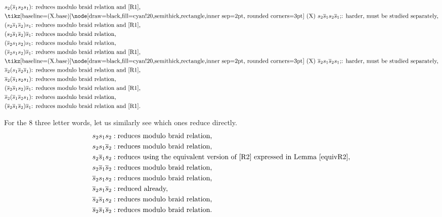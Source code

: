 \documentclass[12pt,reqno]{amsart}
\theoremstyle{definition}
\newcommand{\autour}[1]{\tikz[baseline=(X.base)]\node
  [draw=black,fill=cyan!20,semithick,rectangle,inner sep=2pt,
  rounded corners=3pt] (X) {#1};}
\def\hs{\overline{s}}
\begin{document}
\begin{footnotesize}
\begin{minipage}{.45\textwidth}
\begin{align*}
&s_2 (\hs_1 s_2 s_1)\text{: reduces modulo braid relation and \eqref{R1},}\\
&\text{\autour{$s_2 \hs_1 s_2 \hs_1$}: harder, must be studied separately,}\\
&(s_2 \hs_1 \hs_2) s_1\text{: reduces modulo braid relation and \eqref{R1},}\\
&(s_2 \hs_1 \hs_2) \hs_1\text{: reduces modulo braid relation,}\\
&(\hs_2 s_1 s_2) s_1\text{: reduces modulo braid relation,}\\
&(\hs_2 s_1 s_2) \hs_1\text{: reduces modulo braid relation and \eqref{R1},}\\
&\text{\autour{$\hs_2 s_1 \hs_2 s_1$}: harder, must be studied separately,}\\
&\hs_2 (s_1 \hs_2 \hs_1)\text{: reduces modulo braid relation and \eqref{R1},}\\
&\hs_2 (\hs_1 s_2 s_1)\text{: reduces modulo braid relation,}\\
&(\hs_2 \hs_1 s_2) \hs_1\text{: reduces modulo braid relation and \eqref{R1},}\\
&\hs_2 (\hs_1 \hs_2 s_1)\text{: reduces modulo braid relation,}\\
&(\hs_2 \hs_1 \hs_2) \hs_1\text{: reduces modulo braid relation and \eqref{R1}.}
\end{align*} 
\end{minipage}
\end{footnotesize}

For the 8 three letter words, let us similarly see which ones reduce directly.
\begin{align*}
s_2 s_1 s_2 &: \text{reduces modulo braid relation,}
\\
s_2 s_1 \hs_2 &: \text{reduces modulo braid relation,}
\\
s_2 \hs_1 s_2 &: \text{reduces using the equivalent version of
\eqref{R2} expressed in Lemma~\ref{equivR2},}
\\
s_2 \hs_1 \hs_2 &: \text{reduces modulo braid relation,}
\\
\hs_2 s_1 s_2 &: \text{reduces modulo braid relation,}
\\
\hs_2 s_1 \hs_2 &: \text{reduced already,}
\\
\hs_2 \hs_1 s_2 &: \text{reduces modulo braid relation,}
\\
\hs_2 \hs_1 \hs_2 &: \text{reduces modulo braid relation.}
\end{align*}
\end{document}
